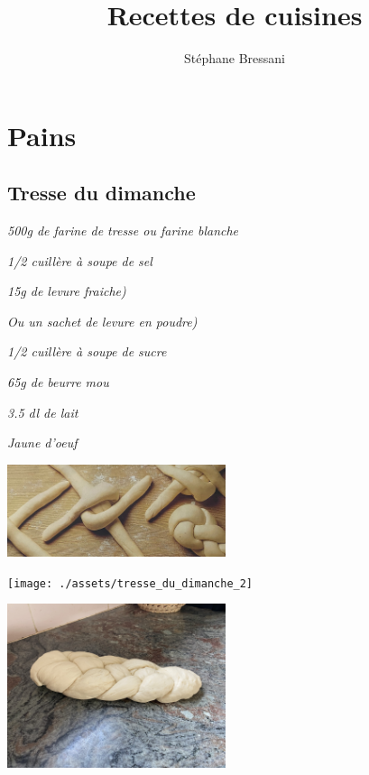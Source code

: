 \documentclass[10pt,a4paper]{report}
\author{Stéphane Bressani}
\title{Recettes de cuisines}
\begin{document}
    \maketitle
    \tableofcontents

    \chapter{Pains}
    \newpage

    \section{Tresse du dimanche}
    \begin{multicols}{2}
        \parbox[1cm]{\textwidth}{
            \begin{description}
                \item
                \textit{500g de farine de tresse ou farine blanche}
                \item
                \textit{1/2 cuillère à soupe de sel}
                \item
                \textit{15g de levure fraiche)}
                \item
                \textit{Ou un sachet de levure en poudre)}
                \item
                \textit{1/2 cuillère à soupe de sucre}
                \item
                \textit{65g de beurre mou}
                \item
                \textit{3.5 dl de lait}
                \item
                \textit{Jaune d'oeuf}
                \item
            \end{description}
        }
        \centerline{\includegraphics[width=0.48\textwidth]{./assets/tresse_du_dimanche_1}}
        \centerline{\texttt{[image: ./assets/tresse\_du\_dimanche\_2]}}
        \centerline{\includegraphics[width=0.48\textwidth]{./assets/tresse_du_dimanche_3}}

\end{multicols}
\end{document}
